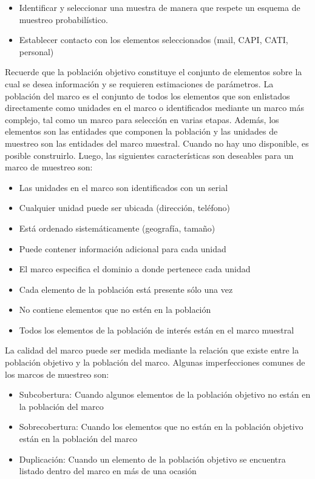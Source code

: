 \documentclass[
  12pt,
  spanish,
]{book}
\begin{document}
\begin{itemize}
\item Identificar y seleccionar una muestra de manera que respete un esquema de muestreo
probabilístico.
\item Establecer contacto con los elementos seleccionados (mail, CAPI, CATI, personal)
\end{itemize}

Recuerde que la población objetivo constituye el conjunto de elementos sobre la cual se desea información y se requieren estimaciones de parámetros. La población del marco es el conjunto de todos los elementos que son enlistados directamente como unidades en el marco o identificados mediante un marco más complejo, tal como un marco para selección en varias etapas. Además, los elementos son las entidades que componen la población y las unidades de muestreo son las entidades del marco muestral. Cuando no hay uno disponible, es posible construirlo. Luego, las siguientes características son deseables para un marco de muestreo son:

\begin{itemize}
\item Las unidades en el marco son identificados con un serial
\item Cualquier unidad puede ser ubicada (dirección, teléfono)
\item Está ordenado sistemáticamente (geografía, tamaño)
\item Puede contener información adicional para cada unidad
\item El marco especifica el dominio a donde pertenece cada unidad
\item Cada elemento de la población está presente sólo una vez
\item No contiene elementos que no estén en la población
\item Todos los elementos de la población de interés están en el marco muestral
\end{itemize}

La calidad del marco puede ser medida mediante la relación que existe entre la población objetivo y la población del marco. Algunas imperfecciones comunes de los marcos de muestreo son:

\begin{itemize}
\item Subcobertura: Cuando algunos elementos de la población objetivo no están en la población del marco
\item Sobrecobertura: Cuando los elementos que no
están en la población objetivo están en la
población del marco
\item Duplicación: Cuando un elemento de la población objetivo se encuentra listado dentro del marco en más de una ocasión
\end{itemize}
\end{document}
